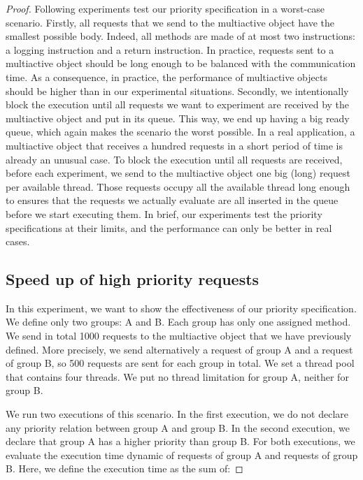 \documentclass[11pt]{report}
\begin{document}
\begin{proof}
Following experiments test our priority specification in a worst-case scenario. Firstly, all requests that we send to the multiactive object have the smallest possible body. Indeed, all methods are made of at most two instructions: a logging instruction and a return instruction.
In practice, requests sent to a multiactive object should be long enough to be balanced with the communication time. As a consequence, in practice, the performance of multiactive objects should be higher than in our experimental situations.
Secondly, we intentionally block the execution until all requests we want to experiment are received by the multiactive object and put in its queue. This way, we end up having a big ready queue, which again makes the scenario the worst possible. In a real application, a multiactive object that receives a hundred requests in a short period of time is already an unusual case. To block the execution until all requests are received, before each experiment, we send to the multiactive object one big (long) request per available thread. Those requests occupy all the available thread long enough to ensures that the requests we actually evaluate are all inserted in the queue before we start executing them.
In brief, our experiments test the priority specifications at their limits, and the performance can only be better in real cases.



\subsection{Speed up of high priority requests}
In this experiment, we want to show the effectiveness of our priority specification. We define only two groups: A and B. Each group has only one assigned method. We send in total 1000 requests to the multiactive object that we have previously defined. More precisely, we send alternatively a request of group A and a request of group B, so 500 requests are sent for each group in total. We set a thread pool that contains four threads. We put no thread limitation for group A, neither for group B.

We run two executions of this scenario. In the first execution, we do not declare any priority relation between group A and group B. In the second execution, we declare that group A has a higher priority than group B. For both executions, we evaluate the execution time dynamic of requests of group A and requests of group B. Here, we define the execution time as the sum of:


\end{proof}
\end{document}
